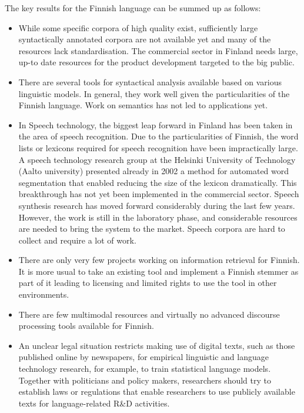 \begin{multicols}{2}
The key results for the Finnish language can be summed up as follows:
\begin{itemize}
\item While some specific corpora of high quality exist, sufficiently large
    syntactically annotated corpora are not available yet and many of the
    resources lack standardisation. The commercial sector in Finland needs
    large, up-to date resources for the product development targeted to the big
    public.

\item There are several tools for syntactical analysis available based on various
    linguistic models. In general, they work well given the particularities of
    the Finnish language. Work on semantics has not led to applications yet.

\item In Speech technology, the biggest leap forward in Finland has been taken in
    the area of speech recognition. Due to the particularities of Finnish, the
    word lists or lexicons required for speech recognition have been
    impractically large. A speech technology research group at the Helsinki
    University of Technology (Aalto university) presented already in 2002 a method for automated
    word segmentation that enabled reducing the size of the lexicon
    dramatically. This breakthrough has not yet been implemented in the
    commercial sector. Speech synthesis research has moved forward considerably
    during the last few years. However, the work is still in the laboratory
    phase, and considerable resources are needed to bring the system to the
    market. Speech corpora are hard to collect and require a lot of work.

\item There are only very few projects working on information retrieval for
    Finnish. It is more usual to take an existing tool and implement a Finnish
    stemmer as part of it leading to licensing and limited rights to use the
    tool in other environments.

\item There are few multimodal resources and virtually no advanced discourse
    processing tools available for Finnish.

\item An unclear legal situation restricts making use of digital texts, such as
    those published online by newspapers, for empirical linguistic and language
    technology research, for example, to train statistical language models.
    Together with politicians and policy makers, researchers should try to
    establish laws or regulations that enable researchers to use publicly
    available texts for language-related R\&D activities.
\end{itemize}


\end{multicols}
